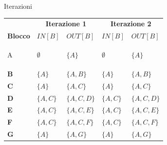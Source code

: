 \documentclass[a4paper, 9pt]{article}
\begin{document}
\begin{tabelladfa}{Iterazioni}
    \centering
    \small %
    \renewcommand{\arraystretch}{1.3} %
    
    \begin{tabularx}{\textwidth}{>{\bfseries}l | X | X | X | X}
        
        \rowcolor{NavyBlue!40} %
        & \multicolumn{2}{c|}{\textbf{Iterazione 1}} & \multicolumn{2}{c}{\textbf{Iterazione 2}}  \\
        
        \rowcolor{LabBlue!20}
        \textbf{Blocco} & \hfil $IN[B]$ \hfil & \hfil $OUT[B]$ \hfil & \hfil $IN[B]$ \hfil & \hfil $OUT[B]$ \hfil\\
        \hline
        
        A & $\emptyset$ & $\{A\}$ & $\emptyset$& $\{A\}$  \\
        \hline
        B & $\{A\}$ & $\{A,B\}$ & $\{A\}$ & $\{A,B\}$\\
        \hline
        C &$\{A\}$ &$\{A,C\}$  &$\{A\}$ &$\{A,C\}$  \\
        \hline
        D &$\{A, C\}$ &$\{A,C,D\}$ &$\{A, C\}$ &$\{A,C,D\}$   \\
        \hline
        E & $\{A,C\}$&$\{A,C,E\}$  & $\{A,C\}$&$\{A,C,E\}$  \\
        \hline
        F & $\{A,C\}$&$\{A,C,F\}$ & $\{A,C\}$&$\{A,C,F\}$ \\
        \hline
        G &$\{A\}$ & $\{A,G\}$  &$\{A\}$ & $\{A,G\}$\\
    \end{tabularx}

\end{tabelladfa}
\pagebreak
\end{document}
